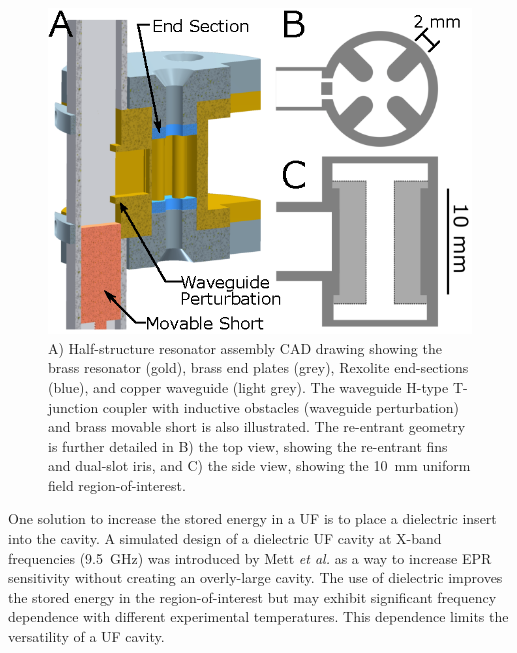 \begin{figure}[htb]\centering
 \includegraphics{Kapitel/Ch2-Images/01-TE01UGeometry.eps}
 \caption[Resonator Assembly CAD Drawing.]{A) Half-structure resonator assembly CAD drawing showing the brass resonator (gold), brass end plates (grey), Rexolite end-sections (blue), and copper waveguide (light grey). The waveguide H-type T-junction coupler with inductive obstacles (waveguide perturbation) and brass movable short is also illustrated. The re-entrant geometry is further detailed in B) the top view, showing the re-entrant fins and dual-slot iris, and C) the side view, showing the 10~mm uniform field region-of-interest.}
 \label{Ch2-fig:GEO}
\end{figure}

One solution to increase the stored energy in a UF \cylTE{} is to place a dielectric insert into the cavity. A simulated design of a dielectric UF cavity at X-band frequencies (9.5~GHz) was introduced by Mett \textit{et al.} as a way to increase EPR sensitivity without creating an overly-large cavity. \cite{HydeUFDR2017} The use of dielectric improves the stored energy in the region-of-interest but may exhibit significant frequency dependence with different experimental temperatures. \cite{Hartnett2003} This dependence limits the versatility of a UF cavity. 

